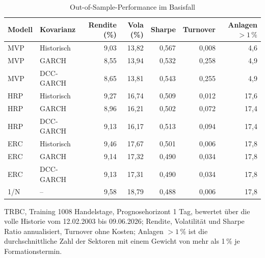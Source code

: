 \begin{table}[htbp]
  \centering
  \footnotesize
  \begin{tabular}{llrrrrr}
    \toprule
    Modell & Kovarianz & Rendite (\%) & Vola (\%) & Sharpe & Turnover & Anlagen $>1\,\%$ \\
    \midrule
    MVP & Historisch & 9,03 & 13,82 & 0,567 & 0,008 & 4,6 \\
    MVP & GARCH & 8,55 & 13,94 & 0,532 & 0,258 & 4,9 \\
    MVP & DCC-GARCH & 8,65 & 13,81 & 0,543 & 0,255 & 4,9 \\
    \midrule
    HRP & Historisch & 9,27 & 16,74 & 0,509 & 0,012 & 17,6 \\
    HRP & GARCH & 8,96 & 16,21 & 0,502 & 0,072 & 17,4 \\
    HRP & DCC-GARCH & 9,13 & 16,17 & 0,513 & 0,094 & 17,4 \\
    \midrule
    ERC & Historisch & 9,46 & 17,67 & 0,501 & 0,006 & 17,8 \\
    ERC & GARCH & 9,14 & 17,32 & 0,490 & 0,034 & 17,8 \\
    ERC & DCC-GARCH & 9,13 & 17,31 & 0,490 & 0,034 & 17,8 \\
    \midrule
    1/N & -- & 9,58 & 18,79 & 0,488 & 0,006 & 17,8 \\
    \bottomrule
  \end{tabular}
  \caption{Out-of-Sample-Performance im Basisfall}
  \label{tab:oekonomie_basis}
  \begin{minipage}{\linewidth}\vspace{0.4em}\centering\footnotesize
  TRBC, Training 1008 Handelstage, Prognosehorizont 1 Tag, bewertet über die volle Historie vom 12.02.2003 bis 09.06.2026; Rendite, Volatilität und Sharpe Ratio annualisiert, Turnover ohne Kosten; Anlagen $>1\,\%$ ist die durchschnittliche Zahl der Sektoren mit einem Gewicht von mehr als 1\,\% je Formationstermin.
  \end{minipage}
\end{table}
